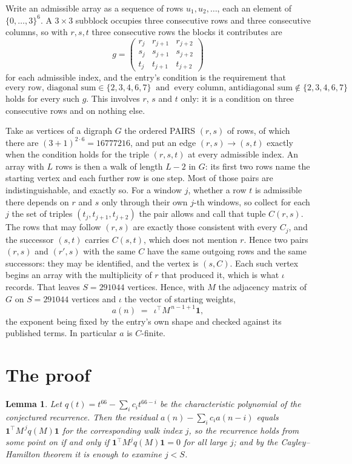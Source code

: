\documentclass[11pt,a4paper]{article}
\theoremstyle{plain}
\newtheorem{lemma}[theorem]{Lemma}
\theoremstyle{definition}
\begin{document}
Write an admissible array as a sequence of rows $u_1,u_2,\dots$, each an element of
$\{0,\dots,3\}^{6}$. A $3\times3$ subblock occupies three consecutive rows and
three consecutive columns, so with $r,s,t$ three consecutive rows the blocks it
contributes are
\[
g=\begin{pmatrix}r_j&r_{j+1}&r_{j+2}\\ s_j&s_{j+1}&s_{j+2}\\ t_j&t_{j+1}&t_{j+2}\end{pmatrix}
\]
for each admissible index, and the entry's condition is the requirement that
\[
\text{every row, diagonal sum} \in \{2,3,4,6,7\}\ \text{ and }\ \text{every column, antidiagonal sum} \notin \{2,3,4,6,7\}
\]
holds for every such $g$. This involves $r$, $s$ and $t$ only: it is a condition on
three consecutive rows and on nothing else.

Take as vertices of a digraph $G$ the ordered PAIRS $(r,s)$ of rows, of which there are
$(3+1)^{2\cdot6}=16777216$, and put an edge $(r,s)\to(s,t)$ exactly when the condition
holds for the triple $(r,s,t)$ at every admissible index. An array with $L$ rows is then a
walk of length $L-2$ in $G$: its first two rows name the starting vertex and each further
row is one step. Most of those pairs are indistinguishable, and exactly so. For a window $j$, whether a row $t$ is admissible there depends on $r$ and $s$ only through their own $j$-th windows, so collect for each $j$ the set of triples $(t_j,t_{j+1},t_{j+2})$ the pair allows and call that tuple $C(r,s)$. The rows that may follow $(r,s)$ are exactly those consistent with every $C_j$, and the successor $(s,t)$ carries $C(s,t)$, which does not mention $r$. Hence two pairs $(r,s)$ and $(r',s)$ with the same $C$ have the same outgoing rows and the same successors: they may be identified, and the vertex is $(s,C)$. Each such vertex begins an array with the multiplicity of $r$ that produced it, which is what $\iota$ records. That leaves $S=291044$ vertices. Hence, with $M$ the adjacency matrix of $G$ on $S=291044$ vertices and
$\iota$ the vector of starting weights,
\[
a(n)\;=\;\,\iota^{\!\top}M^{\,n-1+1}\mathbf{1},
\]
the exponent being fixed by the entry's own shape and checked against its published terms.
In particular $a$ is $C$-finite.

\section{The proof}

\begin{lemma}\label{lem:crit}
Let $q(t)=t^{66}-\sum_i c_it^{66-i}$ be the characteristic polynomial of the
conjectured recurrence. Then the residual $a(n)-\sum_ic_ia(n-i)$ equals
$\mathbf{1}^{\!\top}M^{\,j}q(M)\mathbf{1}$ for the corresponding walk index
$j$, so the recurrence holds from some point on if and only if
$\mathbf{1}^{\!\top}M^{j}q(M)\mathbf{1}=0$ for all large $j$; and by the
Cayley--Hamilton theorem it is enough to examine $j<S$.
\end{lemma}
\end{document}
